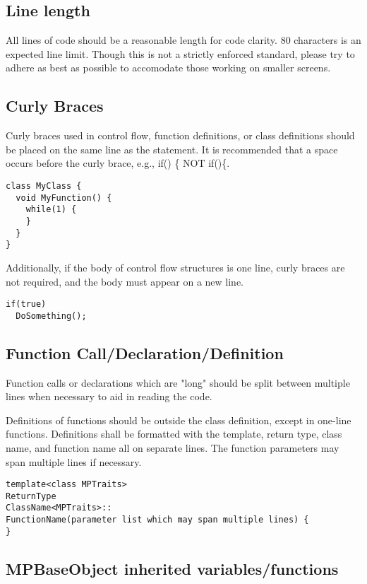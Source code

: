 \documentclass[12pt]{article}
\begin{document}
\subsection{Line length}
All lines of code should be a reasonable length for code clarity. 80 characters
is an expected line limit. Though this is not a strictly enforced standard,
please try to adhere as best as possible to accomodate those working on smaller
screens.

\subsection{Curly Braces}
Curly braces used in control flow, function definitions, or class definitions
should be placed on the same line as the statement. It is recommended that a
space occurs before the curly brace, e.g., if() \{ NOT if()\{.

\begin{lstlisting}
class MyClass {
  void MyFunction() {
    while(1) {
    }
  }
}
\end{lstlisting}

Additionally, if the body of control flow structures is one line, curly braces
are not required, and the body must appear on a new line.

\begin{lstlisting}
if(true)
  DoSomething();
\end{lstlisting}

\subsection{Function Call/Declaration/Definition}
Function calls or declarations which are "long" should be split between multiple
lines when necessary to aid in reading the code.

Definitions of functions should be outside the class definition, except in one-line
functions. Definitions shall be formatted with the template, return type, class
name, and function name all on separate lines. The function parameters may span
multiple lines if necessary.

\begin{lstlisting}
template<class MPTraits>
ReturnType
ClassName<MPTraits>::
FunctionName(parameter list which may span multiple lines) {
}
\end{lstlisting}

\subsection{MPBaseObject inherited variables/functions}
\end{document}

